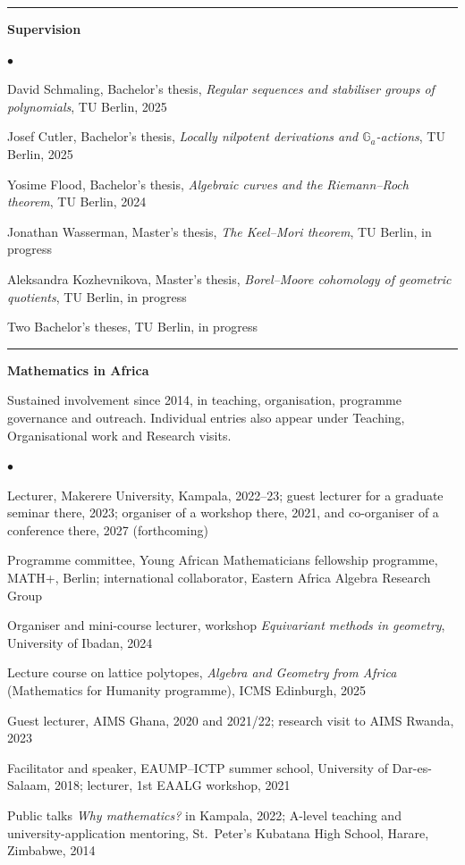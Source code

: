 \documentclass[10pt]{article}
\newcommand{\cvsection}[1]{%
  \par\vspace{0.24cm}%
  \noindent\rule{\textwidth}{0.4pt}%
  \par\vspace{0.12cm}%
  \noindent\textbf{\large #1}%
  \par\vspace{0.12cm}%
}
\newenvironment{cvlist}%
  {\begin{list}{$\bullet$}{%
     \setlength{\leftmargin}{1.1em}\setlength{\labelwidth}{0.8em}%
     \setlength{\itemsep}{0.12cm}\setlength{\parsep}{0pt}%
     \setlength{\topsep}{0pt}\setlength{\partopsep}{0pt}}}%
  {\end{list}}
\begin{document}
\cvsection{Supervision}
\begin{cvlist}
\item David Schmaling, Bachelor's thesis,
{\em Regular sequences and stabiliser groups of polynomials}, TU Berlin, 2025
\item Josef Cutler, Bachelor's thesis,
{\em Locally nilpotent derivations and $\mathbb{G}_a$-actions}, TU Berlin, 2025
\item Yosime Flood, Bachelor's thesis,
{\em Algebraic curves and the Riemann--Roch theorem}, TU Berlin, 2024
\item Jonathan Wasserman, Master's thesis, {\em The Keel--Mori theorem},
TU Berlin, in progress
\item Aleksandra Kozhevnikova, Master's thesis,
{\em Borel--Moore cohomology of geometric quotients}, TU Berlin, in progress
\item Two Bachelor's theses, TU Berlin, in progress
\end{cvlist}

\cvsection{Mathematics in Africa}
{\small Sustained involvement since 2014, in teaching, organisation, programme
governance and outreach. Individual entries also appear under Teaching,
Organisational work and Research visits.}
\begin{cvlist}
\item Lecturer, Makerere University, Kampala, 2022--23; guest lecturer for a
graduate seminar there, 2023; organiser of a workshop there, 2021, and
co-organiser of a conference there, 2027 (forthcoming)
\item Programme committee, Young African Mathematicians fellowship programme,
MATH+, Berlin; international collaborator, Eastern Africa Algebra Research Group
\item Organiser and mini-course lecturer, workshop
{\em Equivariant methods in geometry}, University of Ibadan, 2024
\item Lecture course on lattice polytopes, {\em Algebra and Geometry from Africa}
(Mathematics for Humanity programme), ICMS Edinburgh, 2025
\item Guest lecturer, AIMS Ghana, 2020 and 2021/22; research visit to AIMS
Rwanda, 2023
\item Facilitator and speaker, EAUMP--ICTP summer school, University of
Dar-es-Salaam, 2018; lecturer, 1st EAALG workshop, 2021
\item Public talks {\em Why mathematics?} in Kampala, 2022; A-level teaching and
university-application mentoring, St.\ Peter's Kubatana High School, Harare,
Zimbabwe, 2014
\end{cvlist}
\end{document}
